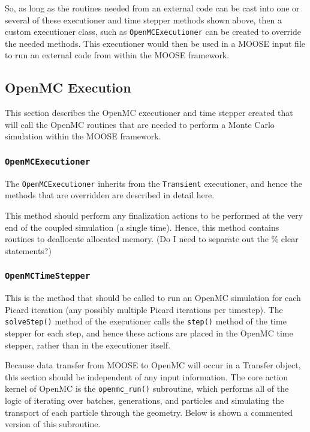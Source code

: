 \documentclass[10pt]{article}
\newcounter{subsubsubsection}[subsubsection]
\numberwithin{equation}{section} %
\begin{document}
So, as long as the routines needed from an external code can be cast into one or several of these executioner and time stepper methods shown above, then a custom executioner class, such as {\tt OpenMCExecutioner} can be created to override the needed methods. This executioner would then be used in a MOOSE input file to run an external code from within the MOOSE framework.

\subsection{OpenMC Execution}
This section describes the OpenMC executioner and time stepper created that will call the OpenMC routines that are needed to perform a Monte Carlo simulation within the MOOSE framework.

\subsubsection{{\tt OpenMCExecutioner}}
The {\tt OpenMCExecutioner} inherits from the {\tt Transient} executioner, and hence the methods that are overridden are described in detail here.

This method should perform any finalization actions to be performed at the very end of the coupled simulation (a single time). Hence, this method contains routines to deallocate allocated memory. (Do I need to separate out the \% clear statements?)

\subsubsection{{\tt OpenMCTimeStepper}}

This is the method that should be called to run an OpenMC simulation for each Picard iteration (any possibly multiple Picard iterations per timestep). The {\tt solveStep()} method of the executioner calls the {\tt step()} method of the time stepper for each step, and hence these actions are placed in the OpenMC time stepper, rather than in the executioner itself.  

Because data transfer from MOOSE to OpenMC will occur in a Transfer object, this section should be independent of any input information. The core action kernel of OpenMC is the {\tt openmc\_run()} subroutine, which performs all of the logic of iterating over batches, generations, and particles and simulating the transport of each particle through the geometry. Below is shown a commented version of this subroutine. 
\end{document}
